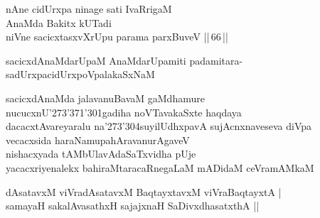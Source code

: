 \begin{entry}
\begin{shl}
nAne cidUrxpa ninage sati IvaRrigaM\\
AnaMda Bakitx kUTadi\\
niVne sacicxtasxvXrUpu parama parxBuveV ||\,66\,||
\end{shl}
\end{entry}

\begin{entry}
\gl{}
\begin{shl}
sacicxdAnaMdarUpaM AnaMdarUpamiti padamitara-\\
sadUrxpacidUrxpoVpalakaSxNaM
\end{shl}
\end{entry}

\begin{entry}
\gl{}
\begin{shl}
sacicxdAnaMda jalavanuBavaM gaMdhamure\\
nucucxnU\char'273\char'371\char'301gadiha noVTavakaSxte haqdaya\\
dacacxtAvareyaralu na\char'273\char'304suyilUdhxpavA sujAcnxnaveseva
diVpa\\
vecacxsida haraNamupahAravanurAgaveV\\
nishacxyada tAMbUlavAdaSaTxvidha pUje\\
yacacxriyenalekx bahiraMtaracaRnegaLaM mADidaM ceVramAMkaM
\end{shl}
\end{entry}

\begin{entry}
\begin{shl}
dAsatavxM viVradAsatavxM BaqtayxtavxM viVraBaqtayxtA |\\
samayaH sakalAvasathxH sajajxnaH SaDivxdhasatxthA ||
\end{shl}
\end{entry}

